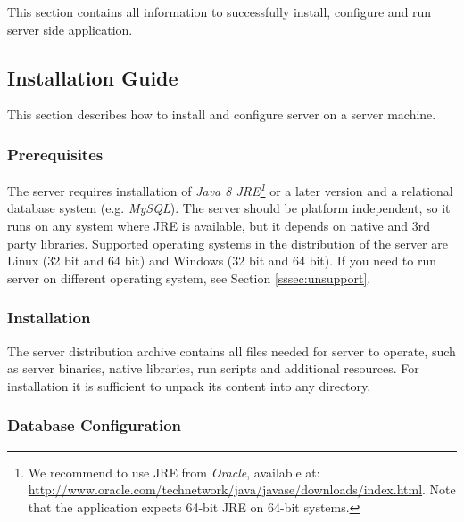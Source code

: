 
This section contains all information to successfully install, configure and run
\textan{} server side application.

\subsection{Installation Guide}

This section describes how to install and configure \textan{} server on a server
machine.

\subsubsection{Prerequisites}
\label{sssec:SerInstPre}

The \textan{} server requires installation of \emph{Java 8 JRE\footnote{We
recommend to use JRE from \emph{Oracle}, available at:
\url{http://www.oracle.com/technetwork/java/javase/downloads/index.html}.
Note that the application expects 64-bit JRE on 64-bit systems.}}
or a later version and a relational database system (e.g. \emph{MySQL}).
The server should be platform independent, so it runs on any system where JRE
is available, but it depends on native and 3rd party libraries. Supported operating
systems in the distribution of the \textan{} server are Linux (32 bit and 64 bit)
and Windows (32 bit and 64 bit).  If you need to run \textan{} server on
different operating system, see Section \ref{sssec:unsupport}.

\subsubsection{Installation}

The \textan{} server distribution archive contains all files needed for \textan{} server to operate,
such as server binaries, native libraries, run scripts and additional resources.
For installation it is sufficient to unpack its content into any directory.

\subsubsection{Database Configuration}

